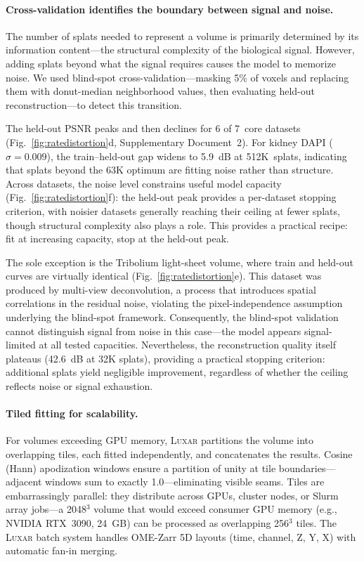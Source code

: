 \documentclass[10pt,twocolumn,letterpaper]{article}
\newcommand{\luxar}{\textsc{Luxar}\xspace}
\begin{document}
\paragraph{Cross-validation identifies the boundary between signal and noise.}
The number of splats needed to represent a volume is primarily determined by its information content---the structural complexity of the biological signal.
However, adding splats beyond what the signal requires causes the model to memorize noise.
We used blind-spot cross-validation---masking 5\% of voxels and replacing them with donut-median neighborhood values\cite{batson2019noise2self}, then evaluating held-out reconstruction---to detect this transition.

The held-out PSNR peaks and then declines for 6 of 7~core datasets (Fig.~\ref{fig:ratedistortion}d, Supplementary Document~2).
For kidney DAPI ($\sigma = 0.009$), the train--held-out gap widens to 5.9~dB at 512K~splats, indicating that splats beyond the 63K optimum are fitting noise rather than structure.
Across datasets, the noise level constrains useful model capacity (Fig.~\ref{fig:ratedistortion}f): the held-out peak provides a per-dataset stopping criterion, with noisier datasets generally reaching their ceiling at fewer splats, though structural complexity also plays a role.
This provides a practical recipe: fit at increasing capacity, stop at the held-out peak.

The sole exception is the Tribolium light-sheet volume, where train and held-out curves are virtually identical (Fig.~\ref{fig:ratedistortion}e).
This dataset was produced by multi-view deconvolution\cite{preibisch2014efficient}, a process that introduces spatial correlations in the residual noise, violating the pixel-independence assumption underlying the blind-spot framework.
Consequently, the blind-spot validation cannot distinguish signal from noise in this case---the model appears signal-limited at all tested capacities.
Nevertheless, the reconstruction quality itself plateaus (42.6~dB at 32K splats), providing a practical stopping criterion: additional splats yield negligible improvement, regardless of whether the ceiling reflects noise or signal exhaustion.

\paragraph{Tiled fitting for scalability.}
For volumes exceeding GPU memory, \luxar partitions the volume into overlapping tiles, each fitted independently, and concatenates the results.
Cosine (Hann) apodization windows ensure a partition of unity at tile boundaries---adjacent windows sum to exactly 1.0---eliminating visible seams.
Tiles are embarrassingly parallel: they distribute across GPUs, cluster nodes, or Slurm array jobs---a 2048$^3$ volume that would exceed consumer GPU memory (e.g., NVIDIA RTX~3090, 24~GB) can be processed as overlapping 256$^3$ tiles.
The \luxar batch system handles OME-Zarr\cite{moore2021ome} 5D layouts (time, channel, Z, Y, X) with automatic fan-in merging.
\end{document}

